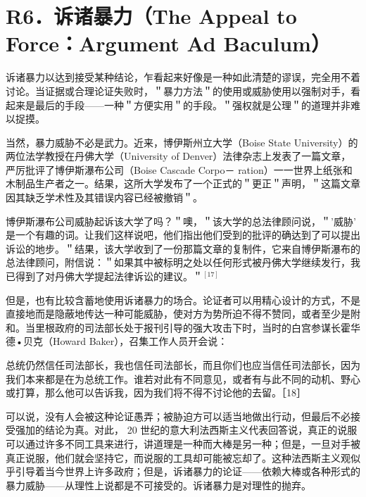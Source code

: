 \section*{R6．诉诸暴力（The Appeal to Force：Argument Ad Baculum）}
诉诸暴力以达到接受某种结论，乍看起来好像是一种如此清楚的谬误，完全用不着讨论。当证据或合理论证失败时，＂暴力方法＂的使用或威胁使用以强制对手，看起来是最后的手段——一种＂方便实用＂的手段。＂强权就是公理＂的道理并非难以捉摸。

当然，暴力威胁不必是武力。近来，博伊斯州立大学（Boise State University）的两位法学教授在丹佛大学（University of Denver）法律杂志上发表了一篇文章，严厉批评了博伊斯瀑布公司（Boise Cascade Corpo－ ration）一一世界上纸张和木制品生产者之一。结果，这所大学发布了一个正式的＂更正＂声明，＂这篇文章因其缺乏学术性及其错误内容已经被撤销＂。

博伊斯瀑布公司威胁起诉该大学了吗？＂噢，＂该大学的总法律顾问说，＂'威胁' 是一个有趣的词。让我们这样说吧，他们指出他们受到的批评的确达到了可以提出诉讼的地步。＂结果，该大学收到了一份那篇文章的复制件，它来自博伊斯瀑布的总法律顾问，附信说：＂如果其中被标明之处以任何形式被丹佛大学继续发行，我已得到了对丹佛大学提起法律诉讼的建议。＂${ }^{[17]}$

但是，也有比较含蓄地使用诉诸暴力的场合。论证者可以用精心设计的方式，不是直接地而是隐蔽地传达一种可能威胁，使对方为势所迫不得不赞同，或者至少是附和。当里根政府的司法部长处于报刊引导的强大攻击下时，当时的白宫参谋长霍华德•贝克（Howard Baker），召集工作人员开会说：

\begin{displayquote}
总统仍然信任司法部长，我也信任司法部长，而且你们也应当信任司法部长，因为我们本来都是在为总统工作。谁若对此有不同意见，或者有与此不同的动机、野心或打算，那么他可以告诉我，因为我们将不得不讨论他的去留。［18］
\end{displayquote}

可以说，没有人会被这种论证愚弄；被胁迫方可以适当地做出行动，但最后不必接受强加的结论为真。对此， 20 世纪的意大利法西斯主义代表回答说，真正的说服可以通过许多不同工具来进行，讲道理是一种而大棒是另一种；但是，一旦对手被真正说服，他们就会坚持它，而说服的工具却可能被忘却了。这种法西斯主义观似乎引导着当今世界上许多政府；但是，诉诸暴力的论证——依赖大棒或各种形式的暴力威胁——从理性上说都是不可接受的。诉诸暴力是对理性的抛弃。 